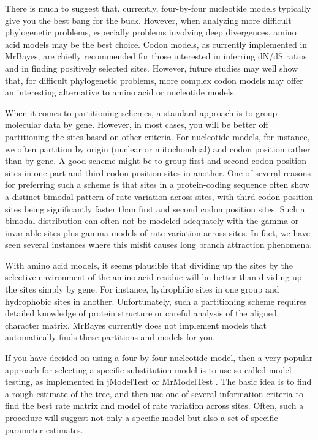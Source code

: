 \documentclass[12pt]{book}
\begin{document}
There is much to suggest that, currently, four-by-four nucleotide models typically give you the
best bang for the buck. However, when analyzing more difficult phylogenetic problems, especially
problems involving deep divergences, amino acid models may be the best choice. Codon models, as
currently implemented in MrBayes, are chiefly recommended for those interested in inferring dN/dS
ratios and in finding positively selected sites. However, future studies may well show that, for
difficult phylogenetic problems, more complex codon models may offer an interesting alternative to
amino acid or nucleotide models.

When it comes to partitioning schemes, a standard approach is to group molecular data by gene.
However, in most cases, you will be better off partitioning the sites based on other criteria. For
nucleotide models, for instance, we often partition by origin (nuclear or mitochondrial) and codon
position rather than by gene. A good scheme might be to group first and second codon position sites
in one part and third codon position sites in another. One of several reasons for preferring such a
scheme is that sites in a protein-coding sequence often show a distinct bimodal pattern of rate
variation across sites, with third codon position sites being significantly faster than first and
second codon position sites. Such a bimodal distribution can often not be modeled adequately with
the gamma or invariable sites plus gamma models of rate variation across sites. In fact, we have
seen several instances where this misfit causes long branch attraction phenomena.

With amino acid models, it seems plausible that dividing up the sites by the selective environment
of the amino acid residue will be better than dividing up the sites simply by gene. For instance,
hydrophilic sites in one group and hydrophobic sites in another. Unfortunately, such a partitioning
scheme requires detailed knowledge of protein structure or careful analysis of the aligned
character matrix. MrBayes currently does not implement models that automatically finds these
partitions and models for you.

If you have decided on using a four-by-four nucleotide model, then a very popular approach for
selecting a specific substitution model is to use so-called model testing, as implemented in
jModelTest \citep{posada08} or MrModelTest \citep{nylander04b}. The basic idea is to find a rough
estimate of the tree, and then use one of several information criteria to find the best rate matrix
and model of rate variation across sites. Often, such a procedure will suggest not only a specific
model but also a set of specific parameter estimates.
\end{document}

